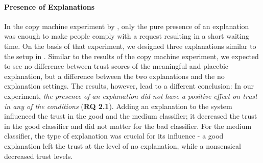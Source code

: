 \paragraph{Presence of Explanations} 
In the copy machine experiment by \cite{langer1978mindlessness}, only the pure presence of an explanation was enough to make people comply with a request resulting in a short waiting time. On the basis of that experiment, we designed three explanations similar to the setup in \cite{langer1978mindlessness}. Similar to the results of the copy machine experiment, we expected to see no difference between trust scores of the meaningful and placebic explanation, but a difference between the two explanations and the no explanation settings. The results, however, lead to a different conclusion: In our experiment, \textit{the presence of an explanation did not have a positive effect on trust in any of the conditions} (\textbf{RQ 2.1}). Adding an explanation to the system influenced the trust in the good and the medium classifier; it decreased the trust in the good classifier and did not matter for the bad classifier. For the medium classifier, the type of explanation was crucial for its influence - a good explanation left the trust at the level of no explanation, while a nonsensical decreased trust levels.\newline
